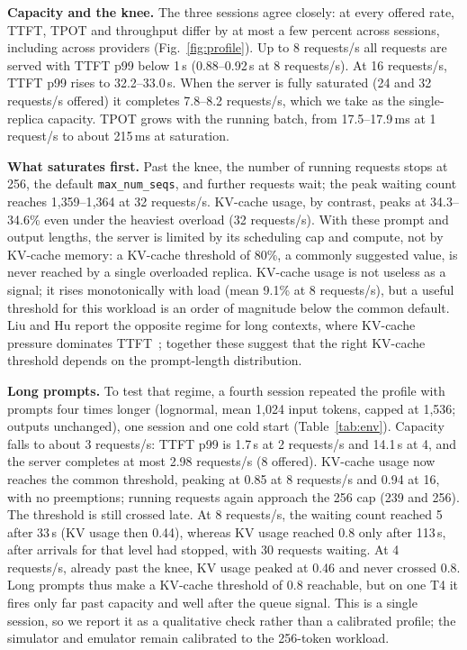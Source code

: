 \documentclass[10pt,conference]{IEEEtran}
\begin{document}
\textbf{Capacity and the knee.} The three sessions agree closely: at every offered
rate, TTFT, TPOT and throughput differ by at most a few percent across sessions,
including across providers (Fig.~\ref{fig:profile}). Up to 8 requests/s all requests
are served with TTFT p99 below 1\,s (0.88--0.92\,s at 8 requests/s). At
16 requests/s, TTFT p99 rises to 32.2--33.0\,s. When the server is fully saturated
(24 and 32 requests/s offered) it completes 7.8--8.2 requests/s, which we take as
the single-replica capacity. TPOT grows with the running batch, from 17.5--17.9\,ms
at 1 request/s to about 215\,ms at saturation.

\textbf{What saturates first.} Past the knee, the number of running requests stops
at 256, the default \texttt{max\_num\_seqs}, and further requests wait; the peak
waiting count reaches 1{,}359--1{,}364 at 32 requests/s. KV-cache usage, by contrast,
peaks at 34.3--34.6\% even under the heaviest overload (32 requests/s). With these prompt and
output lengths, the server is limited by its scheduling cap and compute, not by
KV-cache memory: a KV-cache threshold of 80\%, a commonly suggested value, is
never reached by a single overloaded replica. KV-cache usage is not useless as a
signal; it rises monotonically with load (mean 9.1\% at 8 requests/s), but a
useful threshold for this workload is an order of magnitude below the common
default. Liu and Hu report the opposite regime for long contexts, where
KV-cache pressure dominates TTFT~\cite{liu2026decomposing}; together these suggest
that the right KV-cache threshold depends on the prompt-length distribution.

\textbf{Long prompts.} To test that regime, a fourth session repeated the
profile with prompts four times longer (lognormal, mean 1{,}024 input tokens,
capped at 1{,}536; outputs unchanged), one session and one cold start (Table~\ref{tab:env}).
Capacity falls to about 3 requests/s: TTFT p99 is 1.7\,s at 2 requests/s and
14.1\,s at 4, and the server completes at most 2.98 requests/s (8 offered).
KV-cache usage now reaches the common threshold, peaking at 0.85 at
8 requests/s and 0.94 at 16, with no preemptions; running requests again
approach the 256 cap (239 and 256). The threshold is still crossed late. At
8 requests/s, the waiting count reached 5 after 33\,s (KV usage then 0.44),
whereas KV usage reached 0.8 only after 113\,s, after arrivals for that level
had stopped, with 30 requests waiting. At 4 requests/s, already past the knee,
KV usage peaked at 0.46 and never crossed 0.8. Long prompts thus make a KV-cache
threshold of 0.8 reachable, but on one T4 it fires only far past capacity and
well after the queue signal. This is a single session, so we report it as a
qualitative check rather than a calibrated profile; the simulator and emulator
remain calibrated to the 256-token workload.
\end{document}
